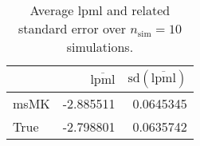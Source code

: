 \begin{table}[H]

\caption{Average lpml and related standard error over $n_{\text{sim}} = 10$ simulations.}
\centering
\begin{tabular}[t]{lrr}
\toprule
  & $\overbar{\text{lpml}}$ & $\text{sd}(\overbar{\text{lpml}})$\\
\midrule
msMK & -2.885511 & 0.0645345\\
True & -2.798801 & 0.0635742\\
\bottomrule
\end{tabular}
\end{table}